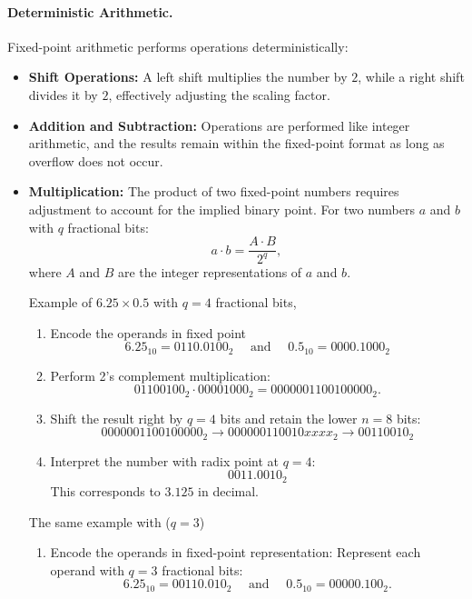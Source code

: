 \paragraph{Deterministic Arithmetic.}
Fixed-point arithmetic performs operations deterministically:
\begin{itemize}
    \item \textbf{Shift Operations:} A left shift multiplies the number by \( 2 \), while a right shift divides it by \( 2 \), effectively adjusting the scaling factor.
    
    \item \textbf{Addition and Subtraction:} Operations are performed like integer arithmetic, and the results remain within the fixed-point format as long as overflow does not occur.
    
    \item \textbf{Multiplication:} The product of two fixed-point numbers requires adjustment to account for the implied binary point. For two numbers \( a \) and \( b \) with \( q \) fractional bits:
\[
a \cdot b = \frac{A \cdot B}{2^q},
\]
where \( A \) and \( B \) are the integer representations of \( a \) and \( b \).

Example of $6.25 \times 0.5$ with $q=4$ fractional bits,
\begin{enumerate}

    \item Encode the operands in fixed point
    \[
        6.25_{10} = 0110.0100_2 \quad \text{ and } \quad 0.5_{10} = 0000.1000_2    
    \]
    
    \item Perform 2's complement multiplication:
    \[
    01100100_2 \cdot 00001000_2 = 0000001100100000_2.
    \]

    \item Shift the result right by $q=4$ bits and retain the lower $n=8$ bits:
    \[
    0000001100100000_2 \rightarrow 000000110010xxxx_2 \rightarrow 00110010_2
    \]

    \item Interpret the number with radix point at $q=4$:
    \[
    0011.0010_2
    \]
    This corresponds to \( 3.125 \) in decimal.
\end{enumerate}

The same example with (\( q = 3 \))
\begin{enumerate}
    \item Encode the operands in fixed-point representation:
    Represent each operand with \( q = 3 \) fractional bits:
    \[
    6.25_{10} = 00110.010_2 \quad \text{ and } \quad 0.5_{10} = 00000.100_2.
    \]


\end{enumerate}
\end{itemize}
